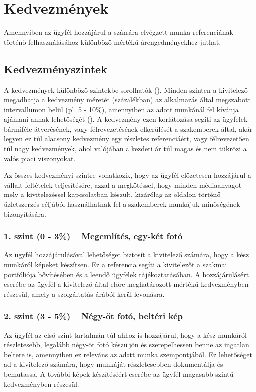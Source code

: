 \section{Kedvezmények}


\newcommand{\sorSzamKe}{\stepcounter{Kecounter}\theKecounter}

Amennyiben az ügyfél hozzájárul a számára elvégzett munka referenciának történő felhasználásához különböző mértékű árengedményekhez juthat.

\subsection{Kedvezményszintek}
A kedvezmények különböző szintekbe sorolhatók (\kovAzon{Ke\_\sorSzamKe}). Minden szinten a kivitelező megadhatja
a kedvezmény méretét (százalékban) az alkalmazás által megszabott intervallumon belül (pl. 5 - 10\%), amennyiben az adott munkánál fel kívánja ajánlani annak lehetőségét (\kovAzon{Ke\_\sorSzamKe}). 
A kedvezmény ezen korlátozása segíti az ügyfelek bármiféle átverésének, vagy félrevezetésének elkerülését a
szakemberek által, akár legyen ez túl alacsony kedvezmény egy részletes referenciáért, vagy félrevezetően túl nagy kedvezmények, ahol valójában a kezdeti ár túl magas és nem tükrözi a valós piaci viszonyokat.

Az összes kedvezményi szintre vonatkozik, hogy az ügyfél előzetesen hozzájárul a vállalt feltételek teljesítésére, azzal a megkötéssel, hogy minden médiaanyagot mely a kivitelezéssel kapcsolatban készült, kizárólag az oldalon történő üzletszerzés céljából használhatnak fel a szakemberek munkájuk minőségének bizonyítására.

\subsubsection{1. szint (0 - 3\%) – Megemlítés, egy-két fotó} 
Az ügyfél hozzájárulásával lehetőséget biztosít a kivitelező számára, hogy a kész munkáról képeket készítsen. Ez a referencia segíti a kivitelezőt a szakmai portfóliója bővítésében és a leendő ügyfelek tájékoztatásában. A hozzájárulásért cserébe az ügyfél a kivitelező által előre meghatározott mértékű kedvezményben részesül, amely a szolgáltatás árából kerül levonásra.

\subsubsection{2. szint (3 - 5\%) – Négy-öt fotó, beltéri kép} 
Az ügyfél az első szint tartalmán túl ahhoz is hozzájárul, hogy a kész munkáról részletesebb, legalább négy-öt fotó készüljön és szerepelhessen benne az ingatlan beltere is, amennyiben ez releváns az adott munka szempontjából. Ez lehetőséget ad a kivitelező számára, hogy munkáját részletesebben dokumentálja és bemutassa. A további képek készítéséért cserébe az ügyfél magasabb szintű kedvezményben részesül.

